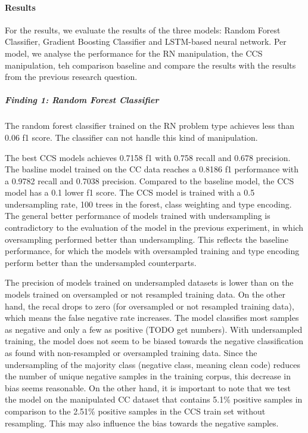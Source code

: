 \paragraph{Results}
For the results, we evaluate the results of the three models: Random Forest Classifier, Gradient Boosting Classifier and LSTM-based neural network. Per model, we analyse the performance for the RN manipulation, the CCS manipulation, teh comparison baseline and compare the results with the results from the previous research question.


\subparagraph{Finding 1: Random Forest Classifier}
The random forest classifier trained on the RN problem type achieves less than 0.06 f1 score. The classifier can not handle this kind of manipulation.

The best CCS models achieves 0.7158 f1 with 0.758 recall and 0.678 precision. The basline model trained on the CC data reaches a 0.8186 f1 performance with a 0.9782 recall and 0.7038 precision. Compared to the baseline model, the CCS model has a 0.1 lower f1 score. The CCS model is trained with a 0.5 undersampling rate, 100 trees in the forest, class weighting and type encoding. The general better performance of models trained with undersampling is contradictory to the evaluation of the model in the previous experiment, in which oversampling performed better than undersampling. This reflects the baseline performance, for which the models with oversampled training and type encoding perform better than the undersampled counterparts. 

The precision of models trained on undersampled datasets is lower than on the models trained on oversampled or not resampled training data. On the other hand, the recal drops to zero (for oversampled or not resampled training data), which means the false negative rate increases. The model classifies most samples as negative and only a few as positive (TODO get numbers). With undersampled training, the model does not seem to be biased towards the negative classification as found with non-resampled or oversampled training data. Since the undersampling of the majority class (negative class, meaning clean code) reduces the number of unique negative samples in the training corpus, this decrease in bias seems reasonable. On the other hand, it is important to note that we test the model on the manipulated CC dataset that contains 5.1\% positive samples in comparison to the 2.51\% positive samples in the CCS train set without resampling. This may also influence the bias towards the negative samples.


